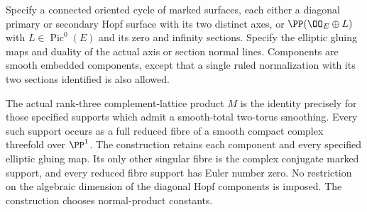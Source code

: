 \begin{proposition}\label{cdp:st:C.2.UN.57}

Specify a connected oriented cycle of marked surfaces, each either a
diagonal primary or secondary Hopf surface with its two distinct axes,
or $\PP(\OO_E\oplus L)$ with $L\in\operatorname{Pic}^0(E)$ and its
zero and infinity sections. Specify the elliptic gluing maps and
duality of the actual axis or section normal lines. Components are
smooth embedded components, except that a single ruled normalization
with its two sections identified is also allowed.

The actual rank-three complement-lattice product $M$ is the identity
precisely for those specified supports which admit a smooth-total
two-torus smoothing. Every such support occurs as a full reduced fibre
of a smooth compact complex threefold over $\PP^1$. The construction
retains each component and every specified elliptic gluing map. Its
only other singular fibre is the complex conjugate marked support,
and every reduced fibre support has Euler number zero. No restriction
on the algebraic dimension of the diagonal Hopf components is imposed.
The construction chooses normal-product constants.
\end{proposition}

